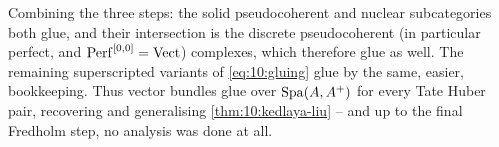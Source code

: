 \begin{remark}[Conclusion]
\label{rmk:10:conclusion}
Combining the three steps: the solid pseudocoherent and nuclear subcategories both
glue, and their intersection is the discrete pseudocoherent (in particular
perfect, and $\operatorname{Perf}^{[0,0]}=\operatorname{Vect}$) complexes, which therefore glue as well. The
remaining superscripted variants of \eqref{eq:10:gluing} glue by the same, easier,
bookkeeping. Thus vector bundles glue over $\operatorname{Spa}(A,A^{+})$ for every Tate Huber
pair, recovering and generalising \cref{thm:10:kedlaya-liu} -- and up to the
final Fredholm step, no analysis was done at all.
\end{remark}
